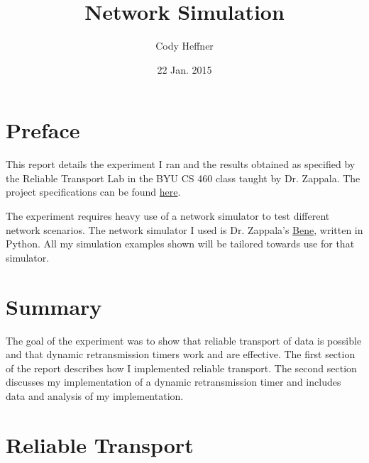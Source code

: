 \documentclass[11pt]{article}
\begin{document}
\lstset{
  language=Python,
  basicstyle=\small,          %
  keywordstyle=\bfseries,
  identifierstyle=,           %
  commentstyle=,              %
  stringstyle=\ttfamily,      %
  showstringspaces=false,     %
  numbers=left,
  numberstyle=\tiny,
  numbersep=5pt,
  frame=tb,
}

\newenvironment{absolutelynopagebreak}
  {\par\nobreak\vfil\penalty0\vfilneg
   \vtop\bgroup}
  {\par\xdef\tpd{\the\prevdepth}\egroup
   \prevdepth=\tpd}

\title{Network Simulation}

\author{Cody Heffner}

\date{22 Jan. 2015}

\maketitle

\section{Preface}

This report details the experiment I ran and the results obtained as specified by the Reliable Transport Lab in the BYU CS 460 class taught by Dr. Zappala. The project specifications can be found \href{http://cs460.byu.edu/winter-2015/labs/reliable-transport}{here}.

The experiment requires heavy use of a network simulator to test different network scenarios. The network simulator I used is Dr. Zappala's \href{https://github.com/zappala/bene}{Bene}, written in Python. All my simulation examples shown will be tailored towards use for that simulator.

\section{Summary}

The goal of the experiment was to show that reliable transport of data is possible and that dynamic retransmission timers work and are effective. The first section of the report describes how I implemented reliable transport. The second section discusses my implementation of a dynamic retransmission timer and includes data and analysis of my implementation.

\section{Reliable Transport}
\end{document}
